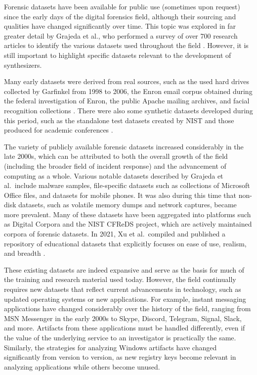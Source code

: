 \documentclass[final,5p,times,twocolumn]{elsarticle}
\begin{document}
Forensic datasets have been available for public use (sometimes upon
request) since the early days of the digital forensics field, although
their sourcing and qualities have changed significantly over time. This
topic was explored in far greater detail by Grajeda et al., who
performed a survey of over 700 research articles to identify the various
datasets used throughout the field
\citep{grajedaAvailabilityDatasetsDigital2017}. However, it is still
important to highlight specific datasets relevant to the development of
synthesizers.

Many early datasets were derived from real sources, such as the used
hard drives collected by Garfinkel from 1998 to 2006, the Enron email
corpus obtained during the federal investigation of Enron, the public
Apache mailing archives, and facial recognition collections
\citep{garfinkelForensicCorporaChallenge2007,grajedaAvailabilityDatasetsDigital2017,yannikosDataCorporaDigital2014,ricanekMORPHLongitudinalImage2006}.
There were also some synthetic datasets developed during this period,
such as the standalone test datasets created by NIST and those produced
for academic conferences \citep{woodsCreatingRealisticCorpora2011}.

The variety of publicly available forensic datasets increased
considerably in the late 2000s, which can be attributed to both the
overall growth of the field (including the broader field of incident
response) and the advancement of computing as a whole. Various notable
datasets described by Grajeda et al.~include malware samples,
file-specific datasets such as collections of Microsoft Office files,
and datasets for mobile phones. It was also during this time that
non-disk datasets, such as volatile memory dumps and network captures,
became more prevalent. Many of these datasets have been aggregated into
platforms such as Digital Corpora
\citep{garfinkelBringingScienceDigital2009,yannikosDataCorporaDigital2014}
and the NIST CFReDS project, which are actively maintained corpora of
forensic datasets. In 2021, Xu et al.~compiled and published a
repository of educational datasets that explicitly focuses on ease of
use, realism, and breadth \citep{xuDesigningSharedDigital2022}.

These existing datasets are indeed expansive and serve as the basis for
much of the training and research material used today. However, the
field continually requires new datasets that reflect current
advancements in technology, such as updated operating systems or new
applications. For example, instant messaging applications have changed
considerably over the history of the field, ranging from MSN Messenger
in the early 2000s to Skype, Discord, Telegram, Signal, Slack, and more.
Artifacts from these applications must be handled differently, even if
the value of the underlying service to an investigator is practically
the same. Similarly, the strategies for analyzing Windows artifacts have
changed significantly from version to version, as new registry keys
become relevant in analyzing applications while others become unused.
\end{document}
